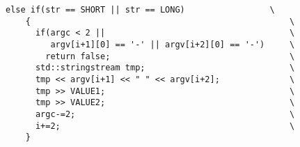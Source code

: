 \begin{Code}\begin{verbatim}else if(str == SHORT || str == LONG)                 \
    {                                                    \
      if(argc < 2 ||                                     \
         argv[i+1][0] == '-' || argv[i+2][0] == '-')     \
        return false;                                    \
      std::stringstream tmp;                             \
      tmp << argv[i+1] << " " << argv[i+2];              \
      tmp >> VALUE1;                                     \
      tmp >> VALUE2;                                     \
      argc-=2;                                           \
      i+=2;                                              \
    }
\end{verbatim}\end{Code}
